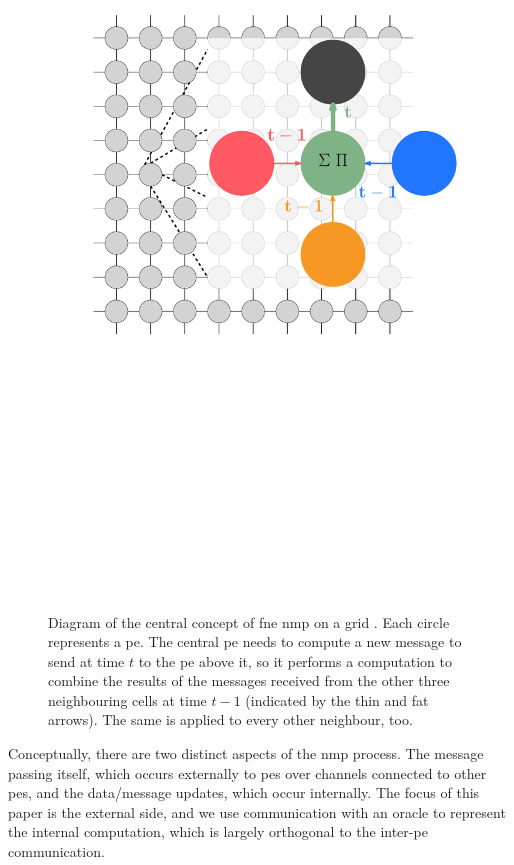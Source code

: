 \begin{figure}
    \centering
    \includegraphics[keepaspectratio,width=1.0\linewidth]{chapters/nmp/images/bp_diagram_recoloured.pdf}
    \caption[Diagram of the central concept of \gls{fne} \acrlong{nmp} on a grid]{Diagram of the central concept of \gls{fne} \gls{nmp} on a grid \cite{lbpmpsmpic}.  Each circle represents a \gls{pe}.  The central \gls{pe} needs to compute a new message to send at time \(t\) to the \gls{pe} above it, so it performs a computation to combine the results of the messages received from the other three neighbouring cells at time \(t - 1\) (indicated by the thin and fat arrows).  The same is applied to every other neighbour, too.}
    \label{fig:nmp:gridmessaging}
\end{figure}

Conceptually, there are two distinct aspects of the \gls{nmp} process.  The message passing itself, which occurs externally to \glspl{pe} over channels connected to other \glspl{pe}, and the data/message updates, which occur internally.  The focus of this paper is the external side, and we use communication with an oracle to represent the internal computation, which is largely orthogonal to the inter-\gls{pe} communication.


